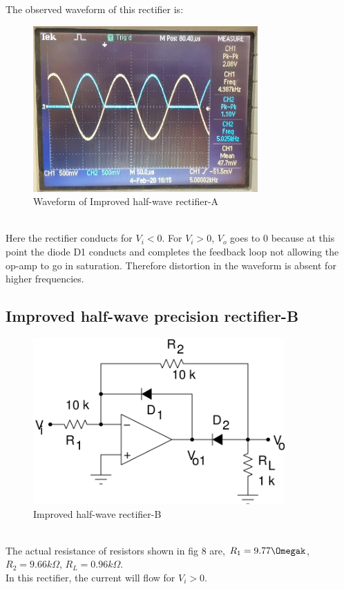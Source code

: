 \documentclass[12pt]{article}
\begin{document}
        The observed waveform of this rectifier is: 
        \begin{figure}[H]
            \centering
            \includegraphics[width = 0.6\linewidth, height = 2.5in]{reports/lab3/half-wave-rect-A-5k.jpeg}
            \caption{Waveform of Improved half-wave rectifier-A}
        \end{figure}
        \\
        Here the rectifier conducts for $V_i < 0$. For $V_i > 0$, $V_o$ goes to 0 because at this point the diode D1 conducts and completes the feedback loop not allowing the op-amp to go in saturation. Therefore distortion in the waveform is absent for higher frequencies.
        
\subsection{Improved half-wave precision rectifier-B}
      \begin{figure}[H]
            \centering
            \includegraphics[width = 0.5\linewidth, height = 2.5in]{reports/lab3/half-rect-B.png}
            \caption{Improved half-wave rectifier-B}
        \end{figure}
        \\
        The actual resistance of resistors shown in fig 8 are,
        $R_1 = 9.77\Omegak$, $R_2 = 9.66k\Omega$, $R_L = 0.96k\Omega$.\\
        In this rectifier, the current will flow for $V_i > 0$.
        \\
        
\end{document}
